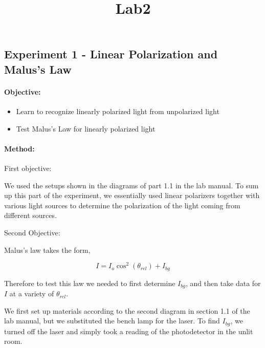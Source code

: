 \documentclass[11pt]{article}
\title{Lab2}
\providecommand{\tightlist}{%
      \setlength{\itemsep}{0pt}\setlength{\parskip}{0pt}}
\begin{document}
    
    
    \maketitle
    
    

    
    \hypertarget{experiment-1---linear-polarization-and-maluss-law}{%
\subsection{Experiment 1 - Linear Polarization and Malus's
Law}\label{experiment-1---linear-polarization-and-maluss-law}}

\hypertarget{objective}{%
\paragraph{Objective:}\label{objective}}

\begin{itemize}
\tightlist
\item
  Learn to recognize linearly polarized light from unpolarized light
\item
  Test Malus's Law for linearly polarized light
\end{itemize}

\hypertarget{method}{%
\paragraph{Method:}\label{method}}

First objective:

We used the setups shown in the diagrams of part 1.1 in the lab manual.
To sum up this part of the experiment, we essentially used linear
polarizers together with various light sources to determine the
polarization of the light coming from different sources.

Second Objective:

Malus's law takes the form,

\[I = I_o \cos^2(\theta_{rel}) + I_{bg}\]

Therefore to test this law we needed to first determine \(I_{bg}\), and
then take data for \(I\) at a variety of \(\theta_{rel}\).

We first set up materials according to the second diagram in section 1.1
of the lab manual, but we substituted the bench lamp for the laser. To
find \(I_{bg}\), we turned off the laser and simply took a reading of
the photodetector in the unlit room.
\end{document}
